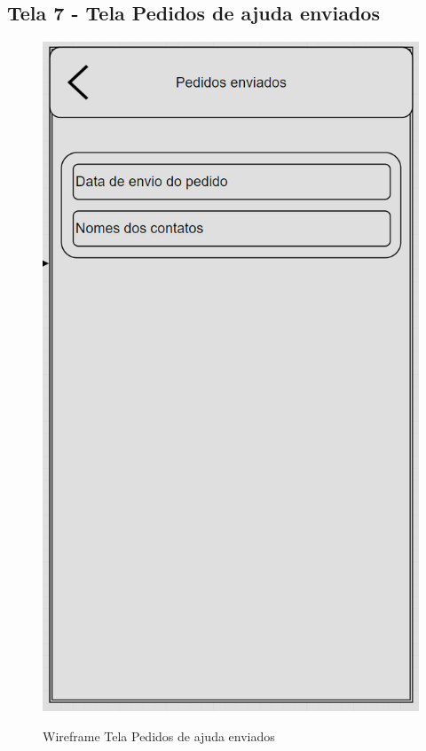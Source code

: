 \subsection{Tela 7 - Tela Pedidos de ajuda enviados}
\begin{figure}[h]
  \begin{center}
  \includegraphics[width=0.7\linewidth]{images/wire-tela-pedidos-enviados.png}\\
  \end{center}
  \caption[Wireframe Tela Pedidos de ajuda enviados]{Wireframe Tela Pedidos de ajuda enviados}
  \label{fig:wireframe-tela-pedidos-ajuda}
\end{figure}
\clearpage
